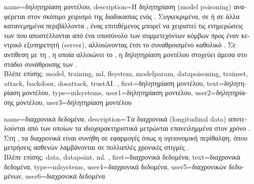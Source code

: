 {name={\foreignlanguage{greek}{δηλητηρίαση μοντέλου}}, 
	description={\foreignlanguage{greek}{Η δηλητηρίαση}  
		(model poisoning) \foreignlanguage{greek}{αναφέρεται στον σκόπιμο χειρισμό της διαδικασίας}  
		\foreignlanguage{greek}{ενός}  . 
		\foreignlanguage{greek}{Συγκεκριμένα, σε}  \foreignlanguage{greek}{ή σε άλλα κατανεμημένα περιβάλλοντα} 
		, \foreignlanguage{greek}{ένας επιτιθέμενος μπορεί να χειριστεί τις ενημερώσεις των}  
		\foreignlanguage{greek}{που αποστέλλονται από ένα υποσύνολο των συμμετεχόντων κόμβων προς έναν κεντρικό εξυπηρετητή} 
		(server), \foreignlanguage{greek}{αλλοιώνοντας έτσι το συναθροισμένο καθολικό}  \cite{FLARE2022}. 
		\foreignlanguage{greek}{Σε αντίθεση με τη} , \foreignlanguage{greek}{η οποία αλλοιώνει το}  
		, \foreignlanguage{greek}{η δηλητηρίαση μοντέλου στοχεύει άμεσα στο στάδιο συνάθροισης των}
		.
				\\
		\foreignlanguage{greek}{Βλέπε επίσης:} \gls{model}, \gls{training}, \gls{ml}, \gls{flsystem}, \gls{modelparam}, \gls{datapoisoning}, \gls{trainset}, 
		\gls{attack}, \gls{backdoor}, \gls{dosattack}, \gls{trustAI}.	},
	first={\foreignlanguage{greek}{δηλητηρίαση μοντέλου}},
	text={\foreignlanguage{greek}{δηλητηρίαση μοντέλου}},
	type=mlsystems,
	user1={\foreignlanguage{greek}{δηλητηρίαση μοντέλου}}, %
    	user2={\foreignlanguage{greek}{δηλητηρίασης μοντέλου}}, %
	user3={\foreignlanguage{greek}{δηλητηρίαση μοντέλου}} %
}

{name={\foreignlanguage{greek}{διαχρονικά δεδομένα}},
	description={\foreignlanguage{greek}{Τα διαχρονικά}  (longitudinal data) 
		\foreignlanguage{greek}{αποτελούνται από}  \foreignlanguage{greek}{των οποίων τα ιδιοχαρακτηριστικά μετρώνται 
		επανειλημμένα στον χρόνο} \cite{fitzmaurice2011applied}. \foreignlanguage{greek}{Στη} , \foreignlanguage{greek}{τα διαχρονικά} 
		 \foreignlanguage{greek}{είναι συνήθη σε εφαρμογές όπως η υγειονομική περίθαλψη, 
		όπου μετρήσεις ασθενών λαμβάνονται σε πολλαπλές χρονικές στιγμές} \cite{Mallinckrodt:2017aa}.
		\\
		\foreignlanguage{greek}{Βλέπε επίσης:} \gls{data}, \gls{datapoint}, \gls{ml}. }, 
	first={\foreignlanguage{greek}{διαχρονικά δεδομένα}},
	text={\foreignlanguage{greek}{διαχρονικά δεδομένα}},
	type=mlsystems,
	user4={\foreignlanguage{greek}{διαχρονικά δεδομένα}}, %
	user5={\foreignlanguage{greek}{διαχρονικών δεδομένων}}, %
	user6={\foreignlanguage{greek}{διαχρονικά δεδομένα}} %
}

